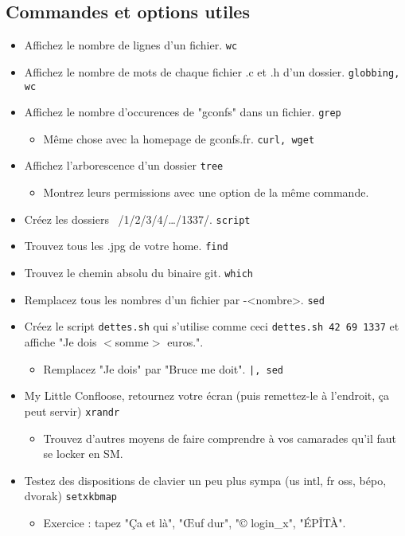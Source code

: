 \documentclass{article}
\begin{document}
\subsection{Commandes et options utiles}
\begin{itemize}
\item Affichez le nombre de lignes d'un fichier. \hfill \texttt{wc}
\item Affichez le nombre de mots de chaque fichier .c et .h d'un dossier. \hfill \texttt{globbing, wc}
\item Affichez le nombre d'occurences de "gconfs" dans un fichier. \hfill \texttt{grep}
  \begin{itemize}
  \item Même chose avec la homepage de gconfs.fr. \hfill \texttt{curl, wget}
  \end{itemize}
\item Affichez l'arborescence d'un dossier \hfill \texttt{tree}
  \begin{itemize}
  \item Montrez leurs permissions avec une option de la même commande.
  \end{itemize}
\item Créez les dossiers ~/1/2/3/4/…/1337/. \hfill \texttt{script}
\item Trouvez tous les .jpg de votre home. \hfill \texttt{find}
\item Trouvez le chemin absolu du binaire git. \hfill \texttt{which}
\item Remplacez tous les nombres d'un fichier par -<nombre>. \hfill \texttt{sed}
\item Créez le script \texttt{dettes.sh} qui s'utilise comme ceci \texttt{dettes.sh 42 69 1337} et affiche "Je dois $<$somme$>$ euros.".
  \begin{itemize}
  \item Remplacez "Je dois" par "Bruce me doit". \hfill \texttt{|, sed}
  \end{itemize}
\item My Little Confloose, retournez votre écran (puis remettez-le à l'endroit, ça peut servir) \hfill \texttt{xrandr}
  \begin{itemize}
  \item Trouvez d'autres moyens de faire comprendre à vos camarades qu'il faut se locker en SM.
  \end{itemize}
\item Testez des dispositions de clavier un peu plus sympa (us intl, fr oss, bépo, dvorak) \hfill \texttt{setxkbmap}
  \begin{itemize}
  \item Exercice : tapez "Ça et là", "Œuf dur", "© login_x", "ÉPÎTÀ".
  \end{itemize}
\end{itemize}
\end{document}
